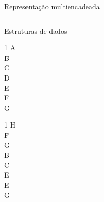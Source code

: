 \begin{frame}{Representação multiencadeada}
\footnotesize
\begin{columns}
\begin{column}{0.3666\textwidth}
Estruturas de dados\\
\vspace{0.133cm}
\begin{minipage}{0.4\linewidth}
\begin{tabbing}
1 \=A\\
  \= B\\
  \> C\\
  \> D\\
   E\\
   F\\
  \> G\\
\end{tabbing}
\end{minipage}
\hspace{0.1\linewidth}
\begin{minipage}{0.4\linewidth}
\begin{tabbing}
1 \=H\\
  \=F\\
  \> G\\
   B\\
   C\\
  \> E\\
  \> E\\
  \> G\\
\end{tabbing}
\end{minipage}
\end{column}
\end{columns}
\end{frame}
